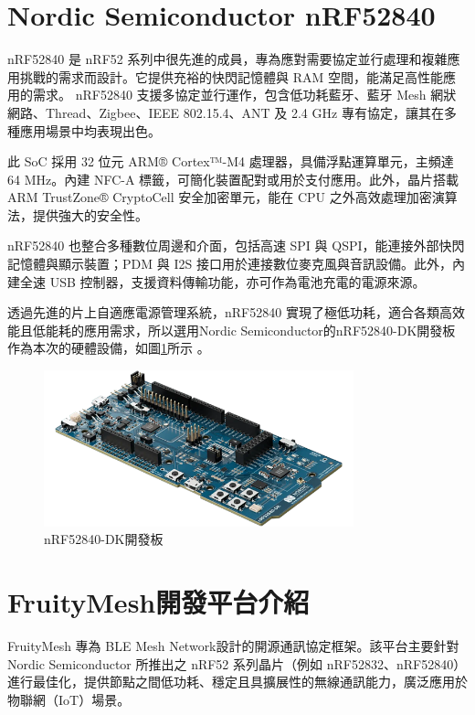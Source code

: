 \begin{ZhChapter}
\section{Nordic Semiconductor nRF52840}
nRF52840 是 nRF52 系列中很先進的成員，專為應對需要協定並行處理和複雜應用挑戰的需求而設計。它提供充裕的快閃記憶體與 RAM 空間，能滿足高性能應用的需求。
nRF52840 支援多協定並行運作，包含低功耗藍牙、藍牙 Mesh 網狀網路、Thread、Zigbee、IEEE 802.15.4、ANT 及 2.4 GHz 專有協定，讓其在多種應用場景中均表現出色。

此 SoC 採用 32 位元 ARM® Cortex™-M4 處理器，具備浮點運算單元，主頻達 64 MHz。內建 NFC-A 標籤，可簡化裝置配對或用於支付應用。此外，晶片搭載 ARM TrustZone® CryptoCell 安全加密單元，能在 CPU 之外高效處理加密演算法，提供強大的安全性。

nRF52840 也整合多種數位周邊和介面，包括高速 SPI 與 QSPI，能連接外部快閃記憶體與顯示裝置；PDM 與 I2S 接口用於連接數位麥克風與音訊設備。此外，內建全速 USB 控制器，支援資料傳輸功能，亦可作為電池充電的電源來源。

透過先進的片上自適應電源管理系統，nRF52840 實現了極低功耗，適合各類高效能且低能耗的應用需求，所以選用Nordic Semiconductor的nRF52840-DK開發板\cite{nordic2023softdevices}作為本次的硬體設備，如圖\ref{fig: nRF52840-DK開發板}所示
。

\begin{figure}[H]
    \centering
    \includegraphics[width = 0.8\textwidth]{image/nRF52840-DK開發板.png}
    \caption{nRF52840-DK開發板\cite{nordic2023softdevices}}
    \label{fig: nRF52840-DK開發板}
\end{figure}

\section{FruityMesh開發平台介紹}
FruityMesh \cite{fruitymesh2023} 專為 BLE Mesh Network設計的開源通訊協定框架。該平台主要針對 Nordic Semiconductor 所推出之 nRF52 系列晶片（例如 nRF52832、nRF52840）進行最佳化，提供節點之間低功耗、穩定且具擴展性的無線通訊能力，廣泛應用於物聯網（IoT）場景。


\end{ZhChapter}
